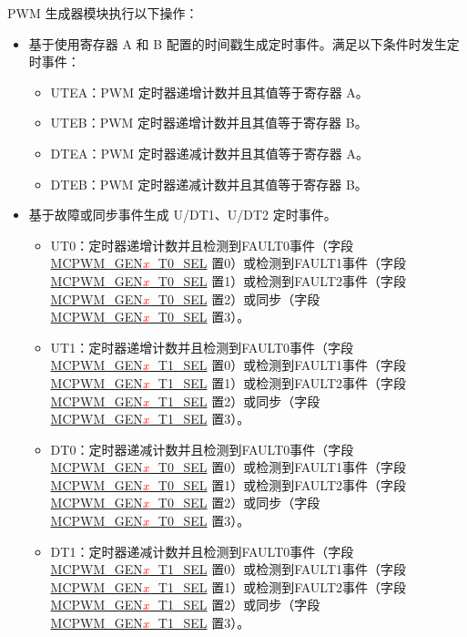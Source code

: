 \documentclass[main\_\_CN.tex]{subfiles}
\begin{document}
PWM 生成器模块执行以下操作：
\begin{itemize}
    \item 基于使用寄存器 A 和 B 配置的时间戳生成定时事件。满足以下条件时发生定时事件：
    \begin{itemize}
        \item UTEA：PWM 定时器递增计数并且其值等于寄存器 A。
        \item UTEB：PWM 定时器递增计数并且其值等于寄存器 B。
        \item DTEA：PWM 定时器递减计数并且其值等于寄存器 A。
        \item DTEB：PWM 定时器递减计数并且其值等于寄存器 B。
    \end{itemize}
    \item 基于故障或同步事件生成 U/DT1、U/DT2 定时事件。
    \begin{itemize}
        \item UT0：定时器递增计数并且检测到FAULT0事件（字段 \hyperref[fielddesc:MCPWMGEN0T0SEL]{MCPWM\_GEN\textcolor{red}{\it{x}}\_T0\_SEL} 置0）或检测到FAULT1事件（字段 \hyperref[fielddesc:MCPWMGEN0T0SEL]{MCPWM\_GEN\textcolor{red}{\it{x}}\_T0\_SEL} 置1）或检测到FAULT2事件（字段 \hyperref[fielddesc:MCPWMGEN0T0SEL]{MCPWM\_GEN\textcolor{red}{\it{x}}\_T0\_SEL} 置2）或同步（字段 \hyperref[fielddesc:MCPWMGEN0T0SEL]{MCPWM\_GEN\textcolor{red}{\it{x}}\_T0\_SEL} 置3）。
        \item UT1：定时器递增计数并且检测到FAULT0事件（字段 \hyperref[fielddesc:MCPWMGEN0T0SEL]{MCPWM\_GEN\textcolor{red}{\it{x}}\_T1\_SEL} 置0）或检测到FAULT1事件（字段 \hyperref[fielddesc:MCPWMGEN0T0SEL]{MCPWM\_GEN\textcolor{red}{\it{x}}\_T1\_SEL} 置1）或检测到FAULT2事件（字段 \hyperref[fielddesc:MCPWMGEN0T0SEL]{MCPWM\_GEN\textcolor{red}{\it{x}}\_T1\_SEL} 置2）或同步（字段 \hyperref[fielddesc:MCPWMGEN0T0SEL]{MCPWM\_GEN\textcolor{red}{\it{x}}\_T1\_SEL} 置3）。
        \item DT0：定时器递减计数并且检测到FAULT0事件（字段 \hyperref[fielddesc:MCPWMGEN0T0SEL]{MCPWM\_GEN\textcolor{red}{\it{x}}\_T0\_SEL} 置0）或检测到FAULT1事件（字段 \hyperref[fielddesc:MCPWMGEN0T0SEL]{MCPWM\_GEN\textcolor{red}{\it{x}}\_T0\_SEL} 置1）或检测到FAULT2事件（字段 \hyperref[fielddesc:MCPWMGEN0T0SEL]{MCPWM\_GEN\textcolor{red}{\it{x}}\_T0\_SEL} 置2）或同步（字段 \hyperref[fielddesc:MCPWMGEN0T0SEL]{MCPWM\_GEN\textcolor{red}{\it{x}}\_T0\_SEL} 置3）。
        \item DT1：定时器递减计数并且检测到FAULT0事件（字段 \hyperref[fielddesc:MCPWMGEN0T0SEL]{MCPWM\_GEN\textcolor{red}{\it{x}}\_T1\_SEL} 置0）或检测到FAULT1事件（字段 \hyperref[fielddesc:MCPWMGEN0T0SEL]{MCPWM\_GEN\textcolor{red}{\it{x}}\_T1\_SEL} 置1）或检测到FAULT2事件（字段 \hyperref[fielddesc:MCPWMGEN0T0SEL]{MCPWM\_GEN\textcolor{red}{\it{x}}\_T1\_SEL} 置2）或同步（字段 \hyperref[fielddesc:MCPWMGEN0T0SEL]{MCPWM\_GEN\textcolor{red}{\it{x}}\_T1\_SEL} 置3）。

\end{itemize}
\end{itemize}
\end{document}
